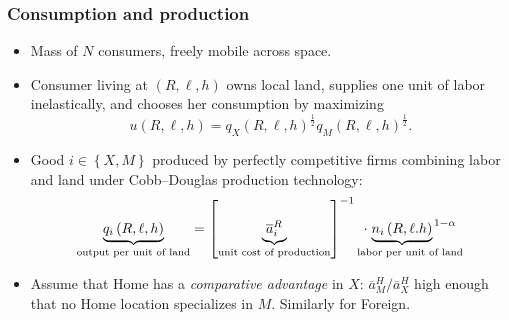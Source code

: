 \documentclass[compress,mathserif]{beamer}
\begin{document}
\begin{frame}%

\frametitle{Consumption and production}
\begin{itemize}
\item Mass of $N$ consumers, freely mobile across space.

\item Consumer living at $\left( R,\ell ,h\right) $ owns local land,
supplies one unit of labor inelastically, and chooses her consumption by
maximizing%
\begin{equation*}
u\left( R,\ell ,h\right) =q_{X}\left( R,\ell ,h\right) ^{\frac{1}{2}%
}q_{M}\left( R,\ell ,h\right) ^{\frac{1}{2}}.
\end{equation*}

\item Good $i\in \left \{ X,M\right \} $ produced by perfectly competitive
firms combining labor and land under Cobb--Douglas production technology:%
\begin{equation*}
\underset{\text{output per unit of land}}{\underbrace{q_{i}\left( R,\ell
,h\right) }}=\left[ \underset{\text{unit cost of production}}{\underbrace{%
\overline{a}_{i}^{R}}}\right] ^{-1}\underset{\text{labor per unit of land}}{%
\cdot \left. \underbrace{n_{i}\left( R,\ell .h\right) }\right. ^{1-\alpha }}
\end{equation*}

\item Assume that Home has a \textit{comparative advantage} in $X$: $%
\overline{a}_{M}^{H}/\overline{a}_{X}^{H}$ high enough that no Home location
specializes in $M$. Similarly for Foreign.
\end{itemize}

\end{frame}%
\end{document}
